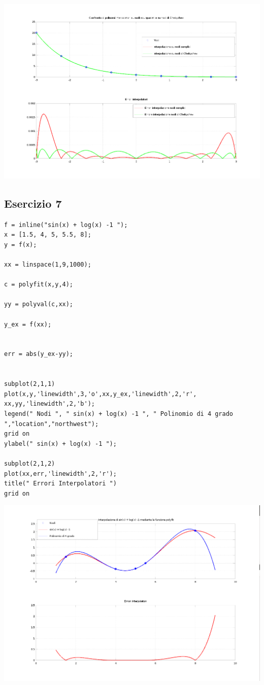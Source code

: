 \documentclass{article}
\begin{document}
\centerline{\includegraphics[scale=0.6]{ex66.png}}


\newpage
\subsection{ Esercizio 7}
\begin{lstlisting}
f = inline("sin(x) + log(x) -1 ");
x = [1.5, 4, 5, 5.5, 8];
y = f(x);

xx = linspace(1,9,1000);

c = polyfit(x,y,4);

yy = polyval(c,xx);

y_ex = f(xx);


err = abs(y_ex-yy);


subplot(2,1,1)
plot(x,y,'linewidth',3,'o',xx,y_ex,'linewidth',2,'r', xx,yy,'linewidth',2,'b');
legend(" Nodi ", " sin(x) + log(x) -1 ", " Polinomio di 4 grado ","location","northwest");
grid on
ylabel(" sin(x) + log(x) -1 ");

subplot(2,1,2)
plot(xx,err,'linewidth',2,'r');
title(" Errori Interpolatori ")
grid on

\end{lstlisting}


\centerline{\includegraphics[scale=0.6]{ex67.png}}
\end{document}
